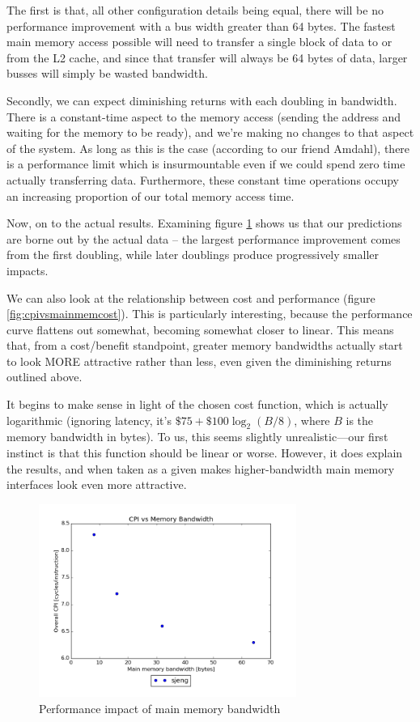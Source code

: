 \documentclass{article}
\begin{document}
The first is that, all other configuration details being equal, there will be no
performance improvement with a bus width greater than 64 bytes. The fastest main
memory access possible will need to transfer a single block of data to or from
the L2 cache, and since that transfer will always be 64 bytes of data, larger
busses will simply be wasted bandwidth.

Secondly, we can expect diminishing returns with each doubling in bandwidth.
There is a constant-time aspect to the memory access (sending the address and
waiting for the memory to be ready), and we're making no changes to that aspect
of the system. As long as this is the case (according to our friend Amdahl),
there is a performance limit which is insurmountable even if we could spend zero
time actually transferring data. Furthermore, these constant time operations
occupy an increasing proportion of our total memory access time.

Now, on to the actual results. Examining figure \ref{fig:cpivsband} shows us
that our predictions are borne out by the actual data -- the largest performance
improvement comes from the first doubling, while later doublings produce
progressively smaller impacts.

We can also look at the relationship between cost and performance (figure
\ref{fig:cpivsmainmemcost}). This is particularly interesting, because the
performance curve flattens out somewhat, becoming somewhat closer to linear.
This means that, from a cost/benefit standpoint, greater memory bandwidths
actually start to look MORE attractive rather than less, even given the
diminishing returns outlined above.

It begins to make sense in light of the chosen cost function, which is actually
logarithmic (ignoring latency, it's $\$75 + \$100 \log_2(B / 8)$, where $B$ is
the memory bandwidth in bytes). To us, this seems slightly unrealistic---our
first instinct is that this function should be linear or worse. However, it does
explain the results, and when taken as a given makes higher-bandwidth main
memory interfaces look even more attractive.

\begin{figure}[ht]
    \centering
    \includegraphics[width=0.75\textwidth]{plots/CPI_vs_Bandwidth.png}
    \caption{Performance impact of main memory bandwidth}
    \label{fig:cpivsband}
\end{figure}
\end{document}

